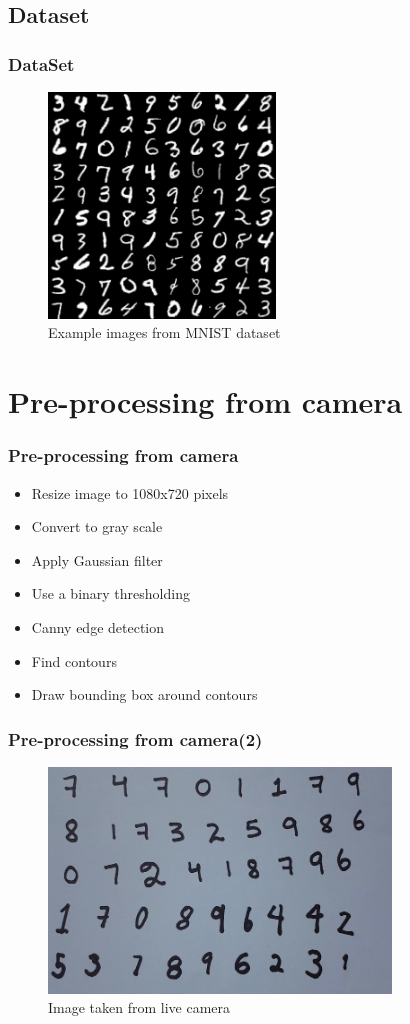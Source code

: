\documentclass[11.5pt,aspectratio=1610,xcolor={usenames,dvipsnames,table}]{beamer}
\begin{document}
\begin{frame}

\section{Dataset}
\frametitle{DataSet}

\begin{figure}[!h]
	\includegraphics[height = 6cm]{images/mnist-digits-small.png}
	\caption{Example images from MNIST dataset \cite{mnist}}
\end{figure}

\end{frame}


\section{Pre-processing from camera}
\begin{frame}
\frametitle{Pre-processing from camera}

\begin{itemize}
	\item Resize image to 1080x720 pixels
	\item Convert to gray scale
	\item Apply Gaussian filter
	\item Use a binary thresholding
	\item Canny edge detection
	\item Find contours
	\item Draw bounding box around contours
\end{itemize}
\end{frame}

\begin{frame}
\frametitle{Pre-processing from camera(2)}

\begin{figure}[!h]
	\includegraphics[height = 6cm]{images/orig.png}
	\caption{Image taken from live camera }
\end{figure}

\end{frame}
\end{document}
